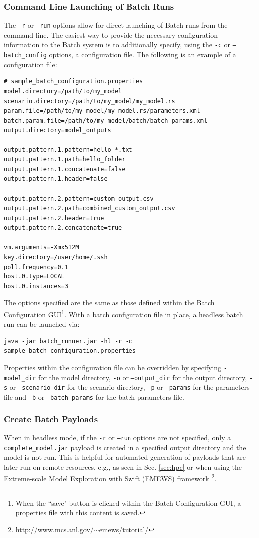 \documentclass[11pt]{amsart}
\begin{document}
\subsubsection{Command Line Launching of Batch Runs}
The {\tt-r} or {\tt--run} options allow for direct launching of Batch runs from the command line. The easiest way to provide the necessary configuration information to the Batch system is to additionally specify, using the {\tt-c} or {\tt--batch\_config} options, a configuration file. The following is an example of a configuration file:
\begin{verbatim}
# sample_batch_configuration.properties
model.directory=/path/to/my_model
scenario.directory=/path/to/my_model/my_model.rs
param.file=/path/to/my_model/my_model.rs/parameters.xml
batch.param.file=/path/to/my_model/batch/batch_params.xml
output.directory=model_outputs

output.pattern.1.pattern=hello_*.txt
output.pattern.1.path=hello_folder
output.pattern.1.concatenate=false
output.pattern.1.header=false

output.pattern.2.pattern=custom_output.csv
output.pattern.2.path=combined_custom_output.csv
output.pattern.2.header=true
output.pattern.2.concatenate=true

vm.arguments=-Xmx512M
key.directory=/user/home/.ssh
poll.frequency=0.1
host.0.type=LOCAL
host.0.instances=3
\end{verbatim}

\noindent The options specified are the same as those defined within the Batch Configuration GUI\footnote{ When the ``save" button is clicked within the Batch Configuration GUI, a properties file with this content is saved.}. With a batch configuration file in place, a headless batch run can be launched via:
\begin{verbatim}
java -jar batch_runner.jar -hl -r -c sample_batch_configuration.properties
\end{verbatim}
Properties within the configuration file can be overridden by specifying {\tt-model\_dir} for the model directory, {\tt-o} or {\tt--output\_dir} for the output directory, {\tt-s} or {\tt--scenario\_dir} for the scenario directory, {\tt-p} or {\tt--params} for the parameters file and {\tt-b} or {\tt--batch\_params} for the batch parameters file.

\subsubsection{Create Batch Payloads}
When in headless mode, if the {\tt-r} or {\tt--run} options are not specified, only a {\tt complete\_model.jar} payload is created in a specified output directory and the model is not run. This is helpful for automated generation of payloads that are later run on remote resources, e.g., as seen in Sec. \ref{sec:hpc} or when using the Extreme-scale Model Exploration with Swift (EMEWS) framework \footnote{ \href{http://www.mcs.anl.gov/~emews/tutorial/}{http://www.mcs.anl.gov/$\sim$emews/tutorial/}}.
\end{document}
